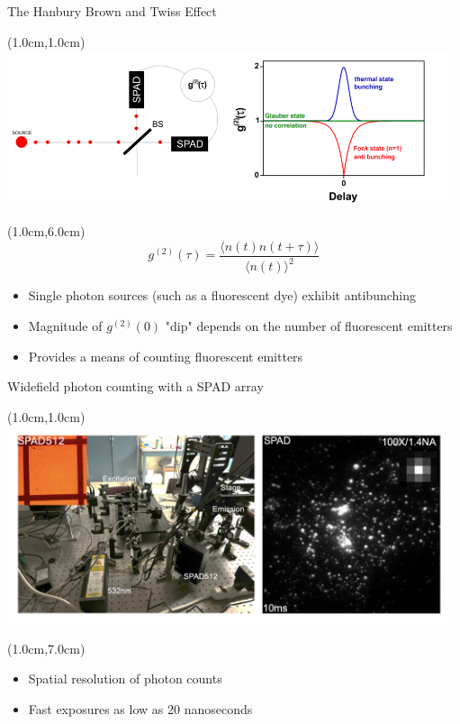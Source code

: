 \documentclass{beamer}					%
\begin{document}
\begin{frame}{The Hanbury Brown and Twiss Effect}
\begin{textblock*}{13cm}(1.0cm,1.0cm)
\includegraphics[width=13cm]{../../spad/spad/media/HBT.png}
\end{textblock*}
\begin{textblock*}{13cm}(1.0cm,6.0cm)
\begin{equation*}
g^{(2)}(\tau) = \frac{\langle n(t) n(t+\tau) \rangle}{\langle n(t) \rangle^2}
\end{equation*}

\begin{itemize}
\item Single photon sources (such as a fluorescent dye) exhibit antibunching
\item Magnitude of $g^{(2)}(0)$ "dip" depends on the number of fluorescent emitters
\item Provides a means of counting fluorescent emitters
\end{itemize}
\end{textblock*}

\end{frame}

\begin{frame}{Widefield photon counting with a SPAD array}
\begin{textblock*}{13cm}(1.0cm,1.0cm)
\includegraphics[width=13cm]{../../spad/spad/media/Widefield.png}
\end{textblock*}
\begin{textblock*}{13cm}(1.0cm,7.0cm)

\begin{itemize}
\item Spatial resolution of photon counts
\item Fast exposures as low as 20 nanoseconds
\end{itemize}
\end{textblock*}
\end{frame}
\end{document}
